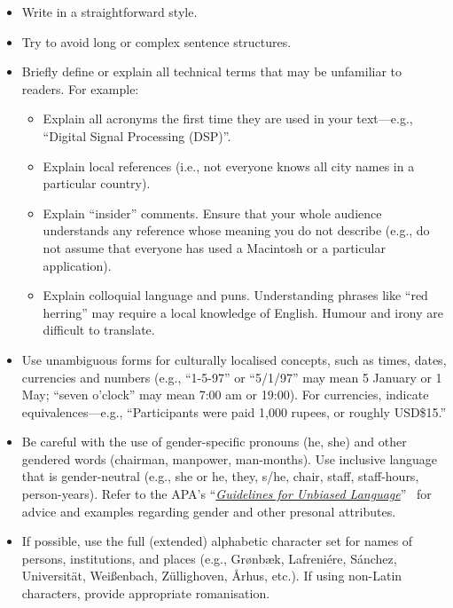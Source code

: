 \documentclass[preprint]{../latex/sigchi-modern}
\begin{document}
\begin{itemize}
\item Write in a straightforward style.
\item Try to avoid long or complex sentence structures.
\item Briefly define or explain all technical terms that may be unfamiliar to
  readers. For example:
  \begin{itemize}
    \item Explain all acronyms the first time they are used in your text---e.g.,
      ``Digital Signal Processing (DSP)''.
    \item Explain local references (i.e., not everyone knows all city names in a
      particular country).
    \item Explain ``insider'' comments. Ensure that your whole audience
      understands any reference whose meaning you do not describe (e.g., do not
      assume that everyone has used a Macintosh or a particular application).
    \item Explain colloquial language and puns. Understanding phrases like ``red
      herring'' may require a local knowledge of English. Humour and irony are
      difficult to translate.
  \end{itemize}
\item Use unambiguous forms for culturally localised concepts, such as times,
  dates, currencies and numbers (e.g., ``1-5-97'' or ``5/1/97'' may mean 5
  January or 1 May; ``seven o'clock'' may mean 7:00 am or 19:00). For
  currencies, indicate equivalences---e.g., ``Participants were paid 1,000
  rupees, or roughly USD\$15.''
\item Be careful with the use of gender-specific pronouns (he, she) and other
  gendered words (chairman, manpower, man-months). Use inclusive language that
  is gender-neutral (e.g., she or he, they, s/he, chair, staff, staff-hours,
  person-years). Refer to the APA's
  ``\href{http://supp.apa.org/style/pubman-ch03.00.pdf}{\it Guidelines for 
  Unbiased Language}''~\cite{apa} for advice and examples regarding  gender and
  other presonal attributes.
\item If possible, use the full (extended) alphabetic character set for names of
  persons, institutions, and places (e.g., Gr{\o}nb{\ae}k, Lafreni\'ere,
  S\'anchez, Universit{\"a}t, Wei{\ss}enbach, Z{\"u}llighoven, \r{A}rhus, etc.).
  If using non-Latin characters, provide appropriate romanisation.
\end{itemize}
\end{document}

